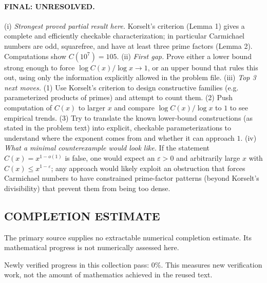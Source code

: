 \paragraph{FINAL: UNRESOLVED.}
(i) \emph{Strongest proved partial result here.} Korselt's criterion (Lemma 1) gives a complete and efficiently checkable characterization; in particular Carmichael numbers are odd, squarefree, and have at least three prime factors (Lemma 2). Computations show $C(10^7)=105$.
(ii) \emph{First gap.} Prove either a lower bound strong enough to force $\log C(x)/\log x\to 1$, or an upper bound that rules this out, using only the information explicitly allowed in the problem file.
(iii) \emph{Top 3 next moves.} (1) Use Korselt's criterion to design constructive families (e.g. parameterized products of primes) and attempt to count them. (2) Push computation of $C(x)$ to larger $x$ and compare $\log C(x)/\log x$ to $1$ to see empirical trends. (3) Try to translate the known lower-bound constructions (as stated in the problem text) into explicit, checkable parameterizations to understand where the exponent comes from and whether it can approach $1$.
(iv) \emph{What a minimal counterexample would look like.} If the statement $C(x)=x^{1-o(1)}$ is false, one would expect an $\varepsilon>0$ and arbitrarily large $x$ with $C(x)\le x^{1-\varepsilon}$; any approach would likely exploit an obstruction that forces Carmichael numbers to have constrained prime-factor patterns (beyond Korselt's divisibility) that prevent them from being too dense.



\subsection*{COMPLETION ESTIMATE}
The primary source supplies no extractable numerical completion estimate. Its mathematical progress is not numerically assessed here.

Newly verified progress in this collection pass: $0\%$. This measures new verification work, not the amount of mathematics achieved in the reused text.
